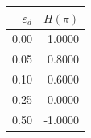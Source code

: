 \begin{tabular}{rr}
\toprule
$\varepsilon_d$ & $H(\pi)$ \\
\midrule
0.00 & 1.0000 \\
0.05 & 0.8000 \\
0.10 & 0.6000 \\
0.25 & 0.0000 \\
0.50 & -1.0000 \\
\bottomrule
\end{tabular}

